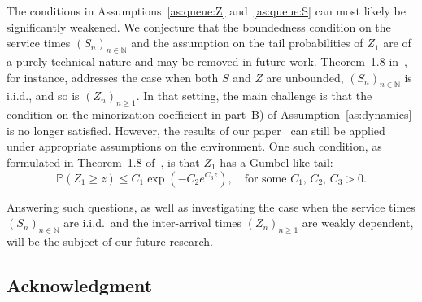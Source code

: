 \documentclass[a4paper,10pt]{article}
\newtheorem{remark}[theorem]{Remark}
\renewcommand{\P}{\mathbb{P}}
\begin{document}
%

\medskip 
The conditions in Assumptions~\ref{as:queue:Z} and~\ref{as:queue:S} can most likely be significantly weakened. We conjecture that the boundedness condition on the service times $(S_n)_{n \in \mathbb{N}}$ and the assumption on the tail probabilities of $Z_1$ are of a purely technical nature and may be removed in future work. Theorem~1.8 in~\cite{lovas2021ergodic}, for instance, addresses the case when both $S$ and $Z$ are unbounded, $(S_n)_{n \in \mathbb{N}}$ is i.i.d., and so is $(Z_n)_{n \ge 1}$. In that setting, the main challenge is that the condition on the minorization coefficient in part~B) of Assumption~\ref{as:dynamics} is no longer satisfied. However, the results of our paper~\cite{lovas} can still be applied under appropriate  assumptions on the environment. One such condition, as formulated in Theorem~1.8 of~\cite{lovas2021ergodic}, is that $Z_1$ has a Gumbel-like tail:
\[
\P(Z_1 \ge z) \le C_1 \exp(-C_2 e^{C_3 z}), \quad \text{for some } C_1,\, C_2,\, C_3 > 0.
\]

Answering such questions, as well as investigating the case when the service times $(S_n)_{n \in \mathbb{N}}$ are i.i.d.\ and the inter-arrival times $(Z_n)_{n \ge 1}$ are weakly dependent, will be the subject of our future research.


\subsection*{Acknowledgment}
\end{document}
